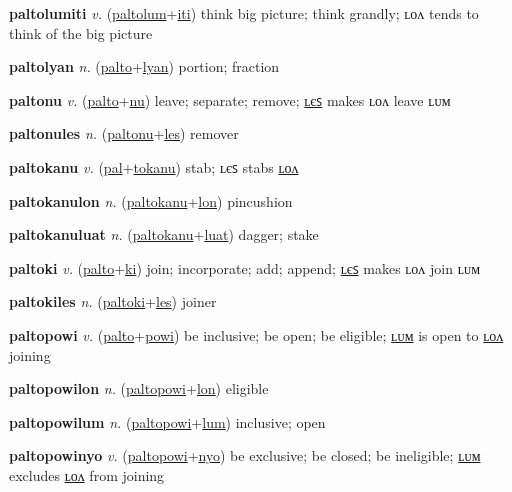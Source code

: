 \textbf{\hypertarget{paltolumiti}{paltolumiti}} \textit{v.} (\hyperlink{paltolum}{paltolum}+\allowbreak \hyperlink{iti}{iti})
think big picture; think grandly; ʟᴏᴧ tends to think of the big picture

\textbf{\hypertarget{paltolyan}{paltolyan}} \textit{n.} (\hyperlink{palto}{palto}+\allowbreak \hyperlink{lyan}{lyan})
portion; fraction

\textbf{\hypertarget{paltonu}{paltonu}} \textit{v.} (\hyperlink{palto}{palto}+\allowbreak \hyperlink{nu}{nu})
leave; separate; remove; \hyperlink{paltonules}{ʟєꜱ} makes ʟᴏᴧ leave ʟᴜᴍ

\textbf{\hypertarget{paltonules}{paltonules}} \textit{n.} (\hyperlink{paltonu}{paltonu}+\allowbreak \hyperlink{les}{les})
remover

\textbf{\hypertarget{paltokanu}{paltokanu}} \textit{v.} (\hyperlink{pal}{pal}+\allowbreak \hyperlink{tokanu}{tokanu})
stab; ʟєꜱ stabs \hyperlink{paltokanulon}{ʟᴏᴧ}

\textbf{\hypertarget{paltokanulon}{paltokanulon}} \textit{n.} (\hyperlink{paltokanu}{paltokanu}+\allowbreak \hyperlink{lon}{lon})
pincushion

\textbf{\hypertarget{paltokanuluat}{paltokanuluat}} \textit{n.} (\hyperlink{paltokanu}{paltokanu}+\allowbreak \hyperlink{luat}{luat})
dagger; stake

\textbf{\hypertarget{paltoki}{paltoki}} \textit{v.} (\hyperlink{palto}{palto}+\allowbreak \hyperlink{ki}{ki})
join; incorporate; add; append; \hyperlink{paltokiles}{ʟєꜱ} makes ʟᴏᴧ join ʟᴜᴍ

\textbf{\hypertarget{paltokiles}{paltokiles}} \textit{n.} (\hyperlink{paltoki}{paltoki}+\allowbreak \hyperlink{les}{les})
joiner

\textbf{\hypertarget{paltopowi}{paltopowi}} \textit{v.} (\hyperlink{palto}{palto}+\allowbreak \hyperlink{powi}{powi})
be inclusive; be open; be eligible; \hyperlink{paltopowilum}{ʟᴜᴍ} is open to \hyperlink{paltopowilon}{ʟᴏᴧ} joining

\textbf{\hypertarget{paltopowilon}{paltopowilon}} \textit{n.} (\hyperlink{paltopowi}{paltopowi}+\allowbreak \hyperlink{lon}{lon})
eligible

\textbf{\hypertarget{paltopowilum}{paltopowilum}} \textit{n.} (\hyperlink{paltopowi}{paltopowi}+\allowbreak \hyperlink{lum}{lum})
inclusive; open

\textbf{\hypertarget{paltopowinyo}{paltopowinyo}} \textit{v.} (\hyperlink{paltopowi}{paltopowi}+\allowbreak \hyperlink{nyo}{nyo})
be exclusive; be closed; be ineligible; \hyperlink{paltopowinyolum}{ʟᴜᴍ} excludes \hyperlink{paltopowinyolon}{ʟᴏᴧ} from joining

